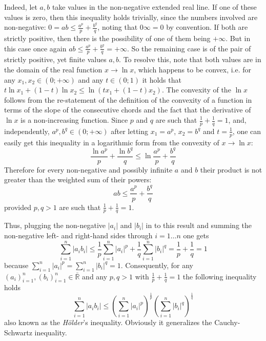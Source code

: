 \documentclass[a4paper]{article}
\newcommand{\brac}[1]{{\left({#1}\right)}}
\newcommand{\abs}[1]{\left | {#1}\right |}
\begin{document}
Indeed, let $a,b$ take values in the non-negative extended real line. If one of these values is zero, then this inequality holds trivially, since the numbers involved are non-negative: $0 = a b \leq \frac{a^p}{p} + \frac{b^q}{q}$, noting that $0 \infty = 0$ by convention. If both are strictly positive, then there is the possibility of one of them being $+\infty$. But in this case once again $a b \leq \frac{a^p}{p} + \frac{b^q}{q} = +\infty$. So the remaining case is of the pair of strictly positive, yet finite values $a,b$. To resolve this, note that both values are in the domain of the real function $x\to\ln{x}$, which happens to be convex, i.e. for any $x_1, x_2 \in \brac{0; +\infty}$ and any $t\in\brac{0;1}$ it holds that $t \ln{x_1} + (1-t) \ln{x_2} \leq \ln{\brac{t x_1 + (1-t) x_2}}$.
The convexity of the $\ln{x}$ follows from the re-statement of the definition of the convexity of a function in terms of the slope of the consecutive chords and the fact that the derivative of $\ln{x}$ is a non-increasing function.
Since $p$ and $q$ are such that $\frac{1}{p}+\frac{1}{q}=1$, and, independently, $a^p, b^q\in\brac{0; +\infty}$ after letting $x_1 = a^p$, $x_2 = b^q$ and $t = \frac{1}{p}$, one can easily get this inequality in a logarithmic form from the convexity of $x\to\ln{x}$: \[\frac{\ln{a^p}}{p} + \frac{\ln{b^q}}{q} \leq \ln{\frac{a^p}{p} + \frac{b^q}{q}}\] Therefore for every non-negative and possibly infinite $a$ and $b$ their product is not greater than the weighted sum of their powers:\[ab \leq \frac{a^p}{p} + \frac{b^q}{q}\] provided $p,q>1$ are such that  $\frac{1}{p} + \frac{1}{q}=1$.

Thus, plugging the non-negative $\abs{a_i}$ and $\abs{b_i}$ in to this result and summing the non-negative left- and right-hand sides through $i=1\ldots n$ one gets \[\sum_{i=1}^n \abs{a_i b_i} \leq \frac{1}{p} \sum_{i=1}^n \abs{a_i}^p + \frac{1}{q} \sum_{i=1}^n \abs{b_i}^q = \frac{1}{p} + \frac{1}{q} = 1\] because $\sum_{i=1}^n \abs{a_i}^p = \sum_{i=1}^n \abs{b_i}^q = 1$. Consequently, for any $\brac{a_i}_{i=1}^n, \brac{b_i}_{i=1}^n\in \bar{\mathbb{R}}$ and any $p,q>1$ with $\frac{1}{p}+\frac{1}{q}=1$ the following inequality holds \[\sum_{i=1}^n \abs{a_i b_i} \leq \brac{\sum_{i=1}^n \abs{a_i}^p}^\frac{1}{p} \brac{\sum_{i=1}^n \abs{b_i}^q}^\frac{1}{q}\] also known as the \emph{H\"older}'s inequality. Obviously it generalizes the Cauchy-Schwartz inequality.
\end{document}
